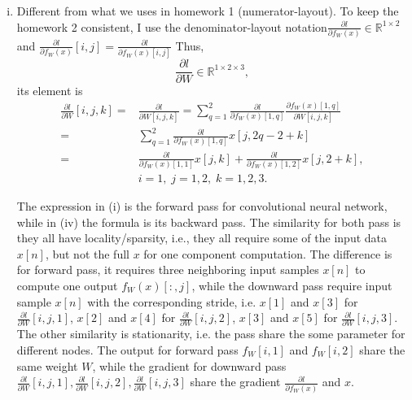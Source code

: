 \documentclass[10pt,a4paper]{article}
\theoremstyle{dotlessP}
\def\RR{\mathbb{R}}
\begin{document}
\begin{enumerate}[(a)]
\begin{enumerate}[(i)]
		\item Different from what we uses in homework 1 (numerator-layout). To keep the homework 2 consistent, I use the denominator-layout notation$\frac{\partial l}{\partial f_W(x)}\in \RR^{1\times 2}$ and $\frac{\partial l}{\partial f_W(x)}[i,j]=\frac{\partial l}{\partial f_W(x)[i,j]}$ Thus, 
		\begin{equation}
		\frac{\partial l}{\partial W}\in \RR^{1\times 2 \times 3},
		\end{equation}
		its element is 
		\begin{equation}
		\begin{aligned}
		\frac{\partial l}{\partial W}[i,j,k]=&\frac{\partial l}{\partial W[i,j,k]}
		= \sum_{q=1}^2\frac{\partial l}{\partial f_W(x)[1,q]}\frac{\partial f_W(x)[1,q]}{\partial W[i,j,k]}\\
		=&\sum_{q=1}^2\frac{\partial l}{\partial f_W(x)[1,q]} x[j,2q-2+k]\\
		= &\frac{\partial l}{\partial f_W(x)[1,1]} x[j,k]+\frac{\partial l}{\partial f_W(x)[1,2]} x[j,2+k], \\
		&i=1,\; j=1,2,\; k=1,2,3.
		\end{aligned}
		\end{equation}
		
		The expression in (i) is the forward pass for convolutional neural network, while in (iv) the formula is its backward pass. The similarity for both pass is they all have locality/sparsity, i.e., they all require some of the input data $x[n]$, but not the full $x$ for one component computation. The difference is for forward pass, it requires three neighboring input samples $x[n]$ to compute one output $f_W(x)[:,j]$, while the downward pass require input sample $x[n]$ with the corresponding stride, i.e. $x[1]$ and $x[3]$ for $\frac{\partial l}{\partial W}[i,j,1]$, $x[2]$ and $x[4]$ for $\frac{\partial l}{\partial W}[i,j,2]$, $x[3]$ and $x[5]$ for $\frac{\partial l}{\partial W}[i,j,3]$. The other similarity is stationarity, i.e. the pass share the some parameter for different nodes. The output for forward pass $f_W[i,1]$ and $f_W[i,2]$ share the same weight $W$, while the gradient for downward pass $\frac{\partial l}{\partial W}[i,j,1], \frac{\partial l}{\partial W}[i,j,2], \frac{\partial l}{\partial W}[i,j,3]$ share the gradient $\frac{\partial l}{\partial f_W(x)}$ and $x$.
	\end{enumerate}
\end{enumerate}
\end{document}
